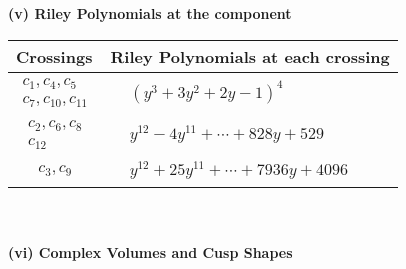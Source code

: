 \documentclass[1p]{elsarticle_modified}
\theoremstyle{definition}
\begin{document}
\newpage\renewcommand{\arraystretch}{1}
\flushleft \textbf{(v) Riley Polynomials at the component}\newline \\
\begin{tabular}{m{50pt}|m{274pt}}
Crossings & \hspace{64pt}Riley Polynomials at each crossing \\
\hline $$\begin{aligned}c_{1},c_{4},c_{5}\\c_{7},c_{10},c_{11}\end{aligned}$$&$\begin{aligned}
&(y^3+3 y^2+2 y-1)^4
\end{aligned}$\\
\hline $$\begin{aligned}c_{2},c_{6},c_{8}\\c_{12}\end{aligned}$$&$\begin{aligned}
&y^{12}-4 y^{11}+\cdots+828 y+529
\end{aligned}$\\
\hline $$\begin{aligned}c_{3},c_{9}\end{aligned}$$&$\begin{aligned}
&y^{12}+25 y^{11}+\cdots+7936 y+4096
\end{aligned}$\\
\hline
\end{tabular}\\~\\
\newpage\flushleft \textbf{(vi) Complex Volumes and Cusp Shapes}
\end{document}
